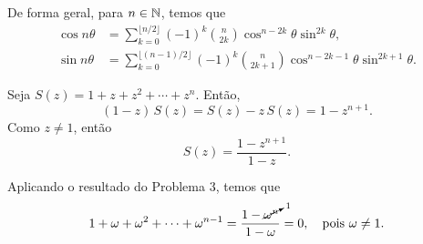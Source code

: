 \begin{questions}
\begin{solution}
    De forma geral, para $n\in{\mathbb N}$, temos que
    \begin{align*}
        \cos n\theta &= \sum_{k=0}^{\lfloor n/2 \rfloor} (-1)^k \binom{n}{2k} \cos^{n-2k}\theta \sin^{2k}\theta,\\
        \sin n\theta &= \sum_{k=0}^{\lfloor (n-1)/2 \rfloor} (-1)^k \binom{n}{2k+1} \cos^{n-2k-1}\theta \sin^{2k+1}\theta.
    \end{align*}
\end{solution}

\begin{solution}
    Seja $S(z) = 1 + z + z^2 + \cdots + z^n$. Então,
    \[(1-z)\,S(z) = S(z) - z\,S(z) = 1 - z^{n+1}.\]
    Como $z\neq1$, então
    \[S(z) = \frac{1-z^{n+1}}{1-z}.\]
\end{solution}

%
\begin{solution}%
Aplicando o resultado do Problema 3, temos que
\[
    1 + \omega + \omega^2 + \cdots + \omega^{n-1} = \frac{1-\cancelto{1}{\omega^n}}{1-\omega} = 0, \quad \text{pois $\omega\neq 1$.}
\]
\end{solution}


\end{questions}
